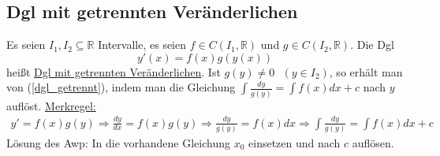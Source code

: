 \documentclass{article}
\begin{document}
\subsection{Dgl mit getrennten Veränderlichen}
Es seien $I_1, I_2 \subseteq \mathbb{R}$ Intervalle, es seien $f \in C(I_1,\mathbb{R})$ und $g \in C(I_2,\mathbb{R})$. Die Dgl
\begin{equation} \label{dgl_getrennt}
    y'(x) = f(x)g(y(x))
\end{equation}
heißt \underline{Dgl mit getrennten Veränderlichen}. Ist $g(y) \neq 0 \text{ } (y \in I_2)$, so erhält man von (\ref{dgl_getrennt}), indem man die Gleichung
$\int \frac{dy}{g(y)} = \int f(x) dx + c$ nach $y$ auflöst.
\underline{Merkregel:}
\begin{align*}
    y' = f(x)g(y) \Rightarrow \frac{dy}{dx} = f(x)g(y) \Rightarrow \frac{dy}{g(y)} = f(x) dx \Rightarrow \int \frac{dy}{g(y)} = \int f(x) dx + c
\end{align*}
Lösung des Awp: In die vorhandene Gleichung $x_0$ einsetzen und nach $c$ auflösen.
\end{document}
